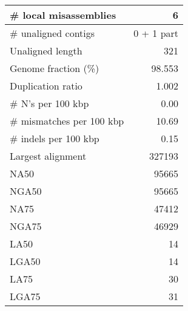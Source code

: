 \documentclass[12pt,a4paper]{article}
\begin{document}
\begin{table}[ht]
\begin{center}
\begin{tabular}{|l*{1}{|r}|}
\# local misassemblies & 6 \\ \hline
\# unaligned contigs & 0 + 1 part \\ \hline
Unaligned length & 321 \\ \hline
Genome fraction (\%) & 98.553 \\ \hline
Duplication ratio & 1.002 \\ \hline
\# N's per 100 kbp & 0.00 \\ \hline
\# mismatches per 100 kbp & 10.69 \\ \hline
\# indels per 100 kbp & 0.15 \\ \hline
Largest alignment & 327193 \\ \hline
NA50 & 95665 \\ \hline
NGA50 & 95665 \\ \hline
NA75 & 47412 \\ \hline
NGA75 & 46929 \\ \hline
LA50 & 14 \\ \hline
LGA50 & 14 \\ \hline
LA75 & 30 \\ \hline
LGA75 & 31 \\ \hline
\end{tabular}
\end{center}
\end{table}
\end{document}
